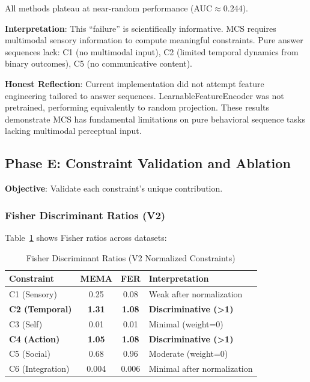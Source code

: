 \documentclass[10pt,journal,compsoc]{IEEEtran}
\begin{document}
All methods plateau at near-random performance (AUC$\approx$0.244).

\textbf{Interpretation}: This ``failure'' is scientifically informative. MCS requires multimodal sensory information to compute meaningful constraints. Pure answer sequences lack: C1 (no multimodal input), C2 (limited temporal dynamics from binary outcomes), C5 (no communicative content).

\textbf{Honest Reflection}: Current implementation did not attempt feature engineering tailored to answer sequences. LearnableFeatureEncoder was not pretrained, performing equivalently to random projection. These results demonstrate MCS has fundamental limitations on pure behavioral sequence tasks lacking multimodal perceptual input.

\subsection{Phase E: Constraint Validation and Ablation}

\textbf{Objective}: Validate each constraint's unique contribution.

\subsubsection{Fisher Discriminant Ratios (V2)}

Table~\ref{tab:fisher} shows Fisher ratios across datasets:

\begin{table}[!t]
\renewcommand{\arraystretch}{1.3}
\caption{Fisher Discriminant Ratios (V2 Normalized Constraints)}
\label{tab:fisher}
\centering
\begin{tabular}{lccp{1.2in}}
\toprule
\textbf{Constraint} & \textbf{MEMA} & \textbf{FER} & \textbf{Interpretation} \\
\midrule
C1 (Sensory) & 0.25 & 0.08 & Weak after normalization \\
\textbf{C2 (Temporal)} & \textbf{1.31} & \textbf{1.08} & \textbf{Discriminative (>1)} \\
C3 (Self) & 0.01 & 0.01 & Minimal (weight=0) \\
\textbf{C4 (Action)} & \textbf{1.05} & \textbf{1.08} & \textbf{Discriminative (>1)} \\
C5 (Social) & 0.68 & 0.96 & Moderate (weight=0) \\
C6 (Integration) & 0.004 & 0.006 & Minimal after normalization \\
\bottomrule
\end{tabular}
\end{table}
\end{document}
